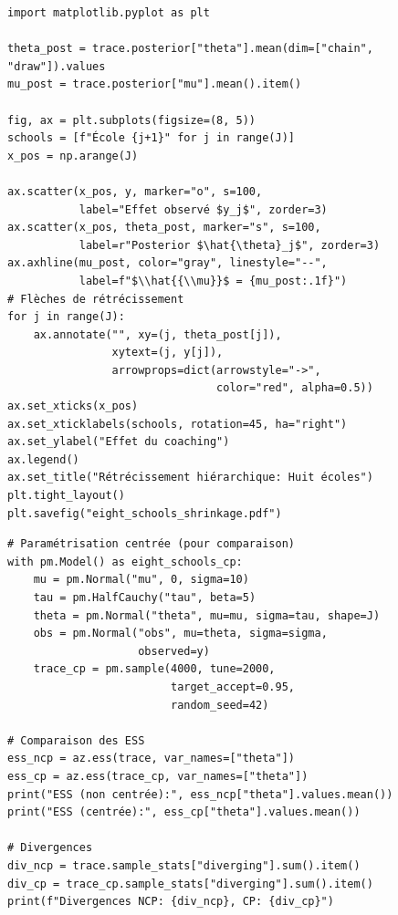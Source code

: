 \begin{codeblock}[title=\textbf{Visualisation du r\'etr\'ecissement}]
\begin{verbatim}
import matplotlib.pyplot as plt

theta_post = trace.posterior["theta"].mean(dim=["chain", "draw"]).values
mu_post = trace.posterior["mu"].mean().item()

fig, ax = plt.subplots(figsize=(8, 5))
schools = [f"École {j+1}" for j in range(J)]
x_pos = np.arange(J)

ax.scatter(x_pos, y, marker="o", s=100,
           label="Effet observé $y_j$", zorder=3)
ax.scatter(x_pos, theta_post, marker="s", s=100,
           label=r"Posterior $\hat{\theta}_j$", zorder=3)
ax.axhline(mu_post, color="gray", linestyle="--",
           label=f"$\\hat{{\\mu}}$ = {mu_post:.1f}")
# Flèches de rétrécissement
for j in range(J):
    ax.annotate("", xy=(j, theta_post[j]),
                xytext=(j, y[j]),
                arrowprops=dict(arrowstyle="->",
                                color="red", alpha=0.5))
ax.set_xticks(x_pos)
ax.set_xticklabels(schools, rotation=45, ha="right")
ax.set_ylabel("Effet du coaching")
ax.legend()
ax.set_title("Rétrécissement hiérarchique: Huit écoles")
plt.tight_layout()
plt.savefig("eight_schools_shrinkage.pdf")
\end{verbatim}
\end{codeblock}

\begin{codeblock}[title=\textbf{Comparaison centr\'ee vs.\ non centr\'ee}]
\begin{verbatim}
# Paramétrisation centrée (pour comparaison)
with pm.Model() as eight_schools_cp:
    mu = pm.Normal("mu", 0, sigma=10)
    tau = pm.HalfCauchy("tau", beta=5)
    theta = pm.Normal("theta", mu=mu, sigma=tau, shape=J)
    obs = pm.Normal("obs", mu=theta, sigma=sigma,
                    observed=y)
    trace_cp = pm.sample(4000, tune=2000,
                         target_accept=0.95,
                         random_seed=42)

# Comparaison des ESS
ess_ncp = az.ess(trace, var_names=["theta"])
ess_cp = az.ess(trace_cp, var_names=["theta"])
print("ESS (non centrée):", ess_ncp["theta"].values.mean())
print("ESS (centrée):", ess_cp["theta"].values.mean())

# Divergences
div_ncp = trace.sample_stats["diverging"].sum().item()
div_cp = trace_cp.sample_stats["diverging"].sum().item()
print(f"Divergences NCP: {div_ncp}, CP: {div_cp}")
\end{verbatim}
\end{codeblock}

